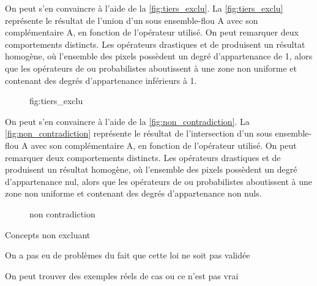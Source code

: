 

On peut s'en convaincre à l'aide de la \autoref{fig:tiers_exclu}. La
\autoref{fig:tiers_exclu} représente le résultat de l'union d'un sous
ensemble-flou \textcolor{RdBu-9-1}{\textsf{A}} avec son complémentaire
\textcolor{RdBu-9-9}{\textsf{A}}, en fonction de l'opérateur
utilisé. On peut remarquer deux comportements distincts. Les
opérateurs drastiques et de  produisent un résultat
homogène, où l'ensemble des pixels possèdent un degré d'appartenance
de 1, alors que les opérateurs de  ou probabilistes
aboutissent à une zone non uniforme et contenant des degrés
d'appartenance inférieurs à 1.

\begin{figure}
  \centering
  
  \caption{fig:tiers_exclu}
  \label{fig:tiers_exclu}
\end{figure}


On peut s'en convaincre à l'aide de la
\autoref{fig:non_contradiction}. La \autoref{fig:non_contradiction}
représente le résultat de l'intersection d'un sous ensemble-flou
\textcolor{RdBu-9-1}{\textsf{A}} avec son complémentaire
\textcolor{RdBu-9-9}{\textsf{A}}, en fonction de l'opérateur
utilisé. On peut remarquer deux comportements distincts. Les
opérateurs drastiques et de  produisent un résultat
homogène, où l'ensemble des pixels possèdent un degré d'appartenance
nul, alors que les opérateurs de  ou probabilistes
aboutissent à une zone non uniforme et contenant des degrés
d'appartenance non nuls.


\begin{figure}
  \centering
  
  \caption{non contradiction}
  \label{fig:non_contradiction}
\end{figure}

Concepts non excluant

On a pas eu de problèmes du fait que cette loi ne soit pas validée

On peut trouver des exemples réels de cas ou ce n'est pas vrai

